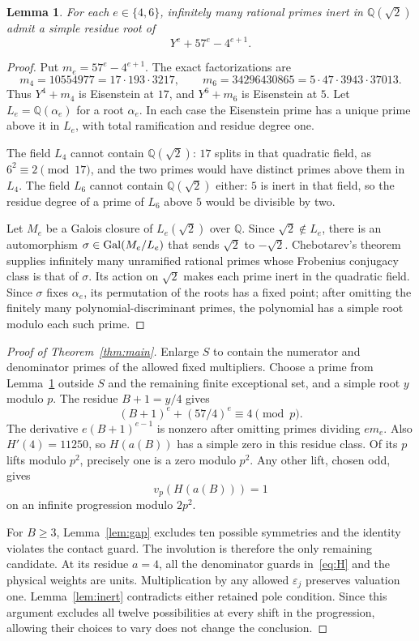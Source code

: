 \documentclass[11pt,a4paper]{article}
\newtheorem{lemma}[theorem]{Lemma}
\newcommand{\Q}{\mathbb Q}\newcommand{\Z}{\mathbb Z}
\begin{document}
\begin{lemma}\label{lem:chebotarev}
For each $e\in\{4,6\}$, infinitely many rational primes inert in
$\Q(\sqrt2)$ admit a simple residue root of
\[
                         Y^e+57^e-4^{e+1}.
\]
\end{lemma}
\begin{proof}
Put $m_e=57^e-4^{e+1}$. The exact factorizations are
\[
 m_4=10554977=17\cdot193\cdot3217,\qquad
 m_6=34296430865=5\cdot47\cdot3943\cdot37013.
\]
Thus $Y^4+m_4$ is Eisenstein at $17$, and $Y^6+m_6$ is
Eisenstein at $5$. Let $L_e=\Q(\alpha_e)$ for a root $\alpha_e$.
In each case the Eisenstein prime has a unique prime above it in
$L_e$, with total ramification and residue degree one.

The field $L_4$ cannot contain $\Q(\sqrt2)$: $17$ splits in that
quadratic field, as $6^2\equiv2\pmod{17}$, and the two primes
would have distinct primes above them in $L_4$. The field $L_6$
cannot contain $\Q(\sqrt2)$ either: $5$ is inert in that field,
so the residue degree of a prime of $L_6$ above $5$ would be
divisible by two.

Let $M_e$ be a Galois closure of $L_e(\sqrt2)$ over $\Q$.
Since $\sqrt2\notin L_e$, there is an automorphism
$\sigma\in\operatorname{Gal}(M_e/L_e)$ that sends $\sqrt2$ to $-\sqrt2$.
Chebotarev's theorem~\cite[Theorem 8.31]{Milne} supplies infinitely
many unramified rational primes whose Frobenius conjugacy class is
that of $\sigma$. Its action on $\sqrt2$ makes each prime inert
in the quadratic field. Since $\sigma$ fixes $\alpha_e$, its
permutation of the roots has a fixed point; after omitting the finitely
many polynomial-discriminant primes, the polynomial has a simple
root modulo each such prime.
\end{proof}

\begin{proof}[Proof of Theorem~\ref{thm:main}]
Enlarge $S$ to contain the numerator and denominator primes of the
allowed fixed multipliers. Choose a prime from
Lemma~\ref{lem:chebotarev} outside $S$ and the remaining finite
exceptional set, and a simple root $y$ modulo $p$.
The residue $B+1=y/4$ gives
\[
                      (B+1)^e+(57/4)^e\equiv4\pmod p.
\]
The derivative $e(B+1)^{e-1}$ is nonzero after omitting primes
dividing $em_e$. Also $H'(4)=11250$, so $H(a(B))$ has a simple
zero in this residue class. Of its $p$ lifts modulo $p^2$, precisely
one is a zero modulo $p^2$. Any other lift, chosen odd, gives
\[
                             v_p(H(a(B)))=1
\]
on an infinite progression modulo $2p^2$.

For $B\ge3$, Lemma~\ref{lem:gap} excludes ten possible symmetries
and the identity violates the contact guard. The involution is
therefore the only remaining candidate. At its residue $a=4$,
all the denominator guards in~\eqref{eq:H} and the physical weights
are units. Multiplication by any allowed $\varepsilon_j$ preserves
valuation one. Lemma~\ref{lem:inert} contradicts either retained
pole condition. Since this argument excludes all twelve possibilities
at every shift in the progression, allowing their choices to vary
does not change the conclusion.
\end{proof}
\end{document}
